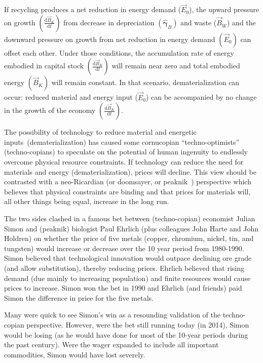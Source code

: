If recycling produces a net reduction in energy demand ($\vec{E}_{0}$), 
the upward pressure on growth 
$\left(\frac{\mathrm{d}\vec{B}_{K}}{\mathrm{d}t}\right)$ 
from decrease in depreciation 
$\left(\hat{\boldsymbol{\gamma}}_{B}\right)$ 
and waste ($\vec{B}_{\dot{W}}$)
and the downward pressure on growth 
from net reduction in energy demand 
$\left(\vec{E}_{0}\right)$ 
can offset each other.
Under those conditions, 
the accumulation rate of energy embodied
in capital stock
$\left(\frac{\mathrm{d}\vec{B}_{K}}{\mathrm{d}t}\right)$ 
will remain near zero 
and total embodied energy 
$(\vec{B}_{K})$ will remain constant. 
In that scenario, 
dematerialization can occur: 
reduced material and energy input ($\vec{E}_{0}$) 
can be accompanied by 
no change in
the growth of the economy
$\left(\frac{\mathrm{d}\vec{B}_{K}}{\mathrm{d}t}\right)$.

The possibility of technology to reduce material and energetic inputs~(dematerialization)
has caused some cornucopian ``techno-optimists''~\cite{Bostrom2011}
(techno-copians) to speculate on the potential of human ingenuity to endlessly overcome
physical resource constraints.
If technology can reduce the need for materials and energy (dematerialization),
prices will decline.
This view should be contrasted with a neo-Ricardian 
(or doomsayer, or peaknik~\cite{Eclipsenow2014})
perspective which believes that physical constraints are binding
and that prices for materials will, all other things being equal, 
increase in the long run.

The two sides clashed in a famous bet between 
(techno-copian) economist Julian Simon and 
(peaknik) biologist Paul Ehrlich (plus colleagues John Harte and John Holdren)
on whether the price of five metals
(copper, chromium, nickel, tin, and tungsten)
would increase or decrease over the 10 year period 
from 1980-1990.~\cite{Kiel2010, Lawn2010}
Simon believed that technological innovation would outpace declining ore grade
(and allow substitution), thereby reducing prices.
Ehrlich believed that rising demand 
(due mainly to increasing population)
and finite resources
would cause prices to increase.
Simon won the bet in 1990 and Ehrlich (and friends) 
paid Simon the difference in price for the five metals.

Many were quick to see Simon's win 
as a resounding validation of the techno-copian perspective.
However, were the bet still running today (in 2014), Simon would be losing
(as he would have done for most of the 10-year periods during the past century).
Were the wager expanded to include all important commodities,
Simon would have lost severely.\cite{Kiel2010, Lawn2010}

